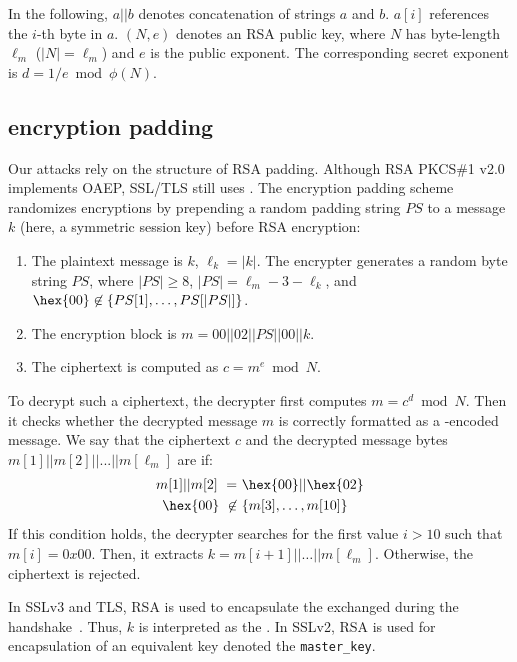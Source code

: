 In the following, $a||b$ denotes concatenation of strings $a$ and $b$.
$a{[i]}$ references the $i$-th byte in $a$. $(N,e)$ denotes an RSA public
key, where $N$ has byte-length $\ell_m$ ($|N|=\ell_m$) and $e$ is the public
exponent. The corresponding secret exponent is $d = 1/e \bmod \phi(N)$.

\subsection{\PKCS encryption padding}
\label{sec:PKCSdescr}

Our attacks rely on the structure of RSA \PKCS padding. Although RSA PKCS\#1
v2.0 implements OAEP, SSL/TLS still uses \PKCS. The \PKCS encryption padding
scheme~\cite{rfc2313} randomizes encryptions by prepending a random padding
string $PS$ to a message $k$ (here, a symmetric session key) before RSA
encryption:

\begin{enumerate} 
	\item The plaintext message is $k$, $\ell_k = |k|$. The encrypter generates a random byte
	string $PS$, where $|PS| \geq 8$, $|PS|=\ell_m-3-\ell_k$, and $\hex{00} \not \in \{PS{[1]}, \ldots,PS{[|PS|]}\}$. 
	\item The encryption block is $m = 00||02||PS||00||k$. 
	\item The ciphertext is computed as $c = m^e \bmod N$. 
\end{enumerate} 

To decrypt such a ciphertext, the decrypter first computes $m = c^d
\bmod N$.  Then it checks whether the decrypted message $m$ is
correctly formatted as a \PKCS-encoded message. We say that the
ciphertext $c$ and the decrypted message bytes $m{[1]} || m{[2]} || ... ||
m{[\ell_m]}$ are \PKCSconform if:
\begin{equation*} 
	\begin{split} 
		m{[1]}||m{[2]} \text{ } = &\text{ } \hex{00} || \hex{02}\\
		\hex{00} \text{ } \not \in &\text{ } \{m{[3]}, \ldots,m{[10]}\}\\ 
	\end{split}
\end{equation*} 
If this condition holds, the decrypter searches for the first value
$i>10$ such that $m{[i]}=0x00$. Then, it extracts $k =
m{[i+1]}||\ldots||m{[\ell_m]}$. Otherwise, the ciphertext is rejected.

In SSLv3 and TLS, RSA \PKCS is used to encapsulate the \pms exchanged during
the handshake~\cite{rfc5246}. Thus, $k$ is interpreted as the \pms. In SSLv2,
RSA \PKCS is used for encapsulation of an equivalent key denoted the
\texttt{master\_key}.



